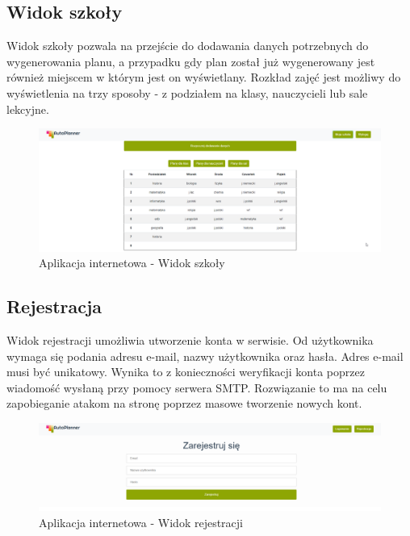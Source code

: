 \subsection{Widok szkoły}
Widok szkoły pozwala na przejście do dodawania danych potrzebnych do wygenerowania planu, a przypadku gdy plan został już wygenerowany jest również miejscem w którym jest on wyświetlany. Rozkład zajęć jest możliwy do wyświetlenia na trzy sposoby - z podziałem na klasy, nauczycieli lub sale lekcyjne.

\begin{figure}[!ht]
\centering\includegraphics[width=\textwidth]{figures/school}
\caption{Aplikacja internetowa - Widok szkoły}\label{rys:school}
\end{figure}
\subsection{Rejestracja}
Widok rejestracji umożliwia utworzenie konta w serwisie. Od użytkownika wymaga się podania adresu e-mail, nazwy użytkownika oraz hasła. Adres e-mail musi być unikatowy. Wynika to z konieczności weryfikacji konta poprzez wiadomość wysłaną przy pomocy serwera SMTP. Rozwiązanie to ma na celu zapobieganie atakom na stronę poprzez masowe tworzenie nowych kont. 
\begin{figure}[!ht]
\centering\includegraphics[width=\textwidth]{figures/register}
\caption{Aplikacja internetowa - Widok rejestracji}\label{rys:register}
\end{figure}
